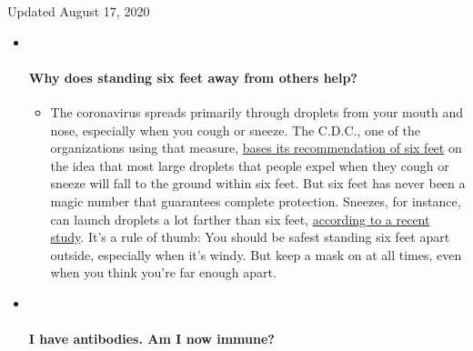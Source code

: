 Updated August 17, 2020

\begin{itemize}
\item ~
  \hypertarget{why-does-standing-six-feet-away-from-others-help}{%
  \paragraph{Why does standing six feet away from others
  help?}\label{why-does-standing-six-feet-away-from-others-help}}

  \begin{itemize}
  \tightlist
  \item
    The coronavirus spreads primarily through droplets from your mouth
    and nose, especially when you cough or sneeze. The C.D.C., one of
    the organizations using that measure,
    \href{https://www.nytimes3xbfgragh.onion/2020/04/14/health/coronavirus-six-feet.html?action=click\&pgtype=Article\&state=default\&region=MAIN_CONTENT_3\&context=storylines_faq}{bases
    its recommendation of six feet} on the idea that most large droplets
    that people expel when they cough or sneeze will fall to the ground
    within six feet. But six feet has never been a magic number that
    guarantees complete protection. Sneezes, for instance, can launch
    droplets a lot farther than six feet,
    \href{https://jamanetwork.com/journals/jama/fullarticle/2763852}{according
    to a recent study}. It's a rule of thumb: You should be safest
    standing six feet apart outside, especially when it's windy. But
    keep a mask on at all times, even when you think you're far enough
    apart.
  \end{itemize}
\item ~
  \hypertarget{i-have-antibodies-am-i-now-immune}{%
  \paragraph{I have antibodies. Am I now
  immune?}\label{i-have-antibodies-am-i-now-immune}}


\end{itemize}
